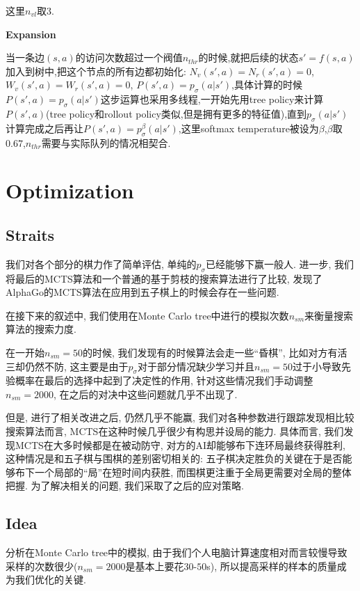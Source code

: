 \documentclass[twocolumn]{article}
\begin{document}
这里$n_{vl}$取$3$.

\noindent\textbf{Expansion}

当一条边$(s, a)$的访问次数超过一个阀值$n_{thr}$的时候,就把后续的状态$s'=f(s,a)$加入到树中,把这个节点的所有边都初始化: $N_v(s',a)=N_r(s',a)=0$,$W_v(s',a)=W_r(s',a)=0$, $P(s',a)=p_\sigma(a|s')$,具体计算的时候$P(s',a)=p_\sigma(a|s')$这步运算也采用多线程,一开始先用tree policy来计算$P(s',a)$(tree policy和rollout policy类似,但是拥有更多的特征值),直到$p_\sigma(a|s')$计算完成之后再让$P(s',a)=p_\sigma^\beta(a|s')$,这里softmax temperature被设为$\beta$,$\beta$取$0.67$,$n_{thr}$需要与实际队列的情况相契合.

\section{Optimization}

\subsection{Straits}

我们对各个部分的棋力作了简单评估, 单纯的$p_\sigma$已经能够下赢一般人. 进一步, 我们将最后的MCTS算法和一个普通的基于剪枝的搜索算法进行了比较, 发现了AlphaGo的MCTS算法在应用到五子棋上的时候会存在一些问题.

在接下来的叙述中, 我们使用在Monte Carlo tree中进行的模拟次数$n_{sm}$来衡量搜索算法的搜索力度. 

在一开始$n_{sm}=50$的时候, 我们发现有的时候算法会走一些“昏棋”, 比如对方有活三却仍然不防, 这主要是由于$p_\sigma$对于部分情况缺少学习并且$n_{sm}=50$过于小导致先验概率在最后的选择中起到了决定性的作用, 针对这些情况我们手动调整$n_{sm}=2000$, 在之后的对决中这些问题就几乎不出现了.

但是, 进行了相关改进之后, 仍然几乎不能赢, 我们对各种参数进行跟踪发现相比较搜索算法而言, MCTS在这种时候几乎很少有构思并设局的能力. 具体而言, 我们发现MCTS在大多时候都是在被动防守, 对方的AI却能够布下连环局最终获得胜利, 这种情况是和五子棋与围棋的差别密切相关的: 五子棋决定胜负的关键在于是否能够布下一个局部的“局”在短时间内获胜, 而围棋更注重于全局更需要对全局的整体把握. 为了解决相关的问题, 我们采取了之后的应对策略.

\subsection{Idea}

分析在Monte Carlo tree中的模拟, 由于我们个人电脑计算速度相对而言较慢导致采样的次数很少($n_{sm}=2000$是基本上要花$30$-$50$s), 所以提高采样的样本的质量成为我们优化的关键.
\end{document}
